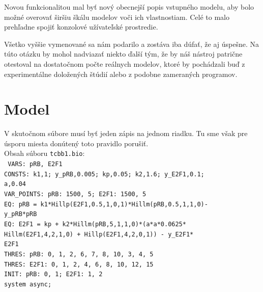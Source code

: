 \documentclass[11pt,final,oneside]{fithesis}
\begin{document}
Novou funkcionalitou mal by\v t nov\'y obecnej\v s\'i popis vstupn\'eho modelu, aby bolo mo\v zn\'e overova\v t \v sir\v siu \v sk\'alu modelov vo\v ci ich 
vlastnostiam. Cel\'e to malo preh\v ladne spoji\v t konzolov\'e u\v z\'ivate\v lsk\'e prostredie.

V\v setko vy\v s\v sie vymenovan\'e sa n\'am podarilo a zost\'ava iba d\'ufa\v t, \v ze aj \'uspe\v sne. Na t\'uto ot\'azku by mohol nadviaza\v t niekto 
\v dal\v s\'i t\'ym, \v ze by n\'a\v s n\'astroj patri\v cne otestoval na dostato\v cnom po\v cte re\'alnych modelov, ktor\'e by poch\'adzali bu\v d z 
experiment\'alne dolo\v zen\'ych \v st\'udi\'i alebo z podobne zameran\'ych programov.

 



\appendix
\chapter{Model}
\label{sec:caseStudyFile}
V skuto\v cnom s\'ubore mus\'i by\v t jeden z\'apis na jednom riadku. Tu sme v\v sak pre \'usporu miesta don\'uten\'y toto pravidlo poru\v si\v t.\\

\noindent
Obsah s\'uboru {\tt tcbb1.bio}:\\

{\tt
\noindent
VARS: pRB, E2F1\\

\noindent
CONSTS: k1,1; y\_pRB,0.005; kp,0.05; k2,1.6; y\_E2F1,0.1;\\ a,0.04\\

\noindent
VAR\_POINTS: pRB: 1500, 5; E2F1: 1500, 5\\

\noindent
EQ: pRB = k1*Hillp(E2F1,0.5,1,0,1)*Hillm(pRB,0.5,1,1,0)- \\y\_pRB*pRB\\

\noindent
EQ: E2F1 = kp + k2*Hillm(pRB,5,1,1,0)*(a*a*0.0625*\\Hillm(E2F1,4,2,1,0) + Hillp(E2F1,4,2,0,1)) - y\_E2F1*\\E2F1\\

\noindent
THRES: pRB:  0, 1, 2, 6, 7, 8, 10, 3, 4, 5\\
THRES: E2F1: 0, 1, 2, 4, 6, 8, 10, 12, 15\\

\noindent
INIT: pRB: 0, 1; E2F1: 1, 2\\

\noindent
system async;\\
}
\end{document}
